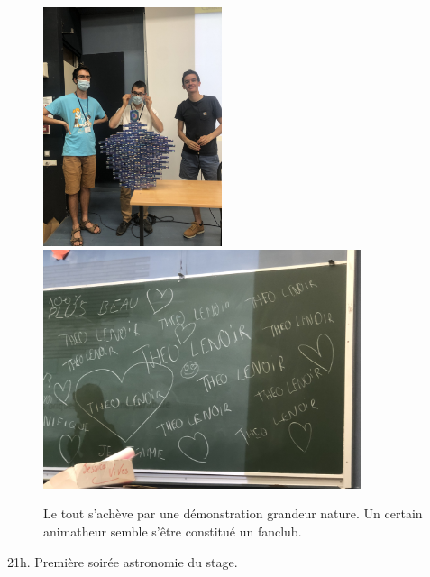 \begin{figure}[H]
\centering\includegraphics[height=7cm]{CR-17-3.jpg}\hspace{2cm}\includegraphics[height=7cm]{CR-17-4.jpg}
\caption{Le tout s’achève par une démonstration grandeur nature. Un certain animatheur semble s'être constitué un fanclub.}
\end{figure}

21h. Première soirée astronomie du stage.